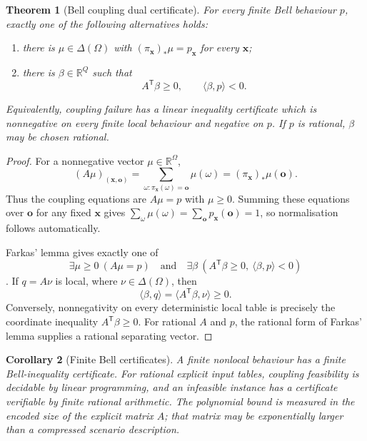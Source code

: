 \documentclass[11pt]{article}
\theoremstyle{plain}
\newtheorem{theorem}{Theorem}[section]
\newtheorem{corollary}[theorem]{Corollary}
\theoremstyle{definition}
\theoremstyle{remark}
\begin{document}
\begin{theorem}[Bell coupling dual certificate]\label{thm:bell-dual}
For every finite Bell behaviour $p$, exactly one of the following alternatives
holds:
\begin{enumerate}[label=(\roman*)]
\item there is $\mu\in\Delta(\Omega)$ with
$(\pi_{\mathbf x})_*\mu=p_{\mathbf x}$ for every $\mathbf x$;
\item there is $\beta\in\mathbb R^Q$ such that
\[
A^{\mathsf T}\beta\ge0,
\qquad
\langle\beta,p\rangle<0.
\]
\end{enumerate}
Equivalently, coupling failure has a linear inequality certificate which is
nonnegative on every finite local behaviour and negative on $p$. If $p$ is
rational, $\beta$ may be chosen rational.
\end{theorem}

\begin{proof}
For a nonnegative vector $\mu\in\mathbb R^\Omega$,
\[
(A\mu)_{(\mathbf x,\mathbf o)}
=\sum_{\omega:\pi_{\mathbf x}(\omega)=\mathbf o}\mu(\omega)
=(\pi_{\mathbf x})_*\mu(\mathbf o).
\]
Thus the coupling equations are $A\mu=p$ with $\mu\ge0$. Summing these
equations over $\mathbf o$ for any fixed $\mathbf x$ gives
$\sum_\omega\mu(\omega)=\sum_{\mathbf o}p_{\mathbf x}(\mathbf o)=1$, so
normalisation follows automatically.

Farkas' lemma gives exactly one of
\[
\exists\mu\ge0\ (A\mu=p)
\quad\text{and}\quad
\exists\beta\ (A^{\mathsf T}\beta\ge0,
\ \langle\beta,p\rangle<0)
\]
\cite{schrijver}. If $q=A\nu$ is local, where
$\nu\in\Delta(\Omega)$, then
\[
\langle\beta,q\rangle
=\langle A^{\mathsf T}\beta,\nu\rangle\ge0.
\]
Conversely, nonnegativity on every deterministic local table is precisely the
coordinate inequality $A^{\mathsf T}\beta\ge0$. For rational $A$ and $p$, the
rational form of Farkas' lemma supplies a rational separating vector.
\end{proof}

\begin{corollary}[Finite Bell certificates]\label{cor:bell-certificates}
A finite nonlocal behaviour has a finite Bell-inequality certificate. For
rational explicit input tables, coupling feasibility is decidable by linear
programming, and an infeasible instance has a certificate verifiable by finite
rational arithmetic. The polynomial bound is measured in the encoded size of
the explicit matrix $A$; that matrix may be exponentially larger than a
compressed scenario description.
\end{corollary}
\end{document}
